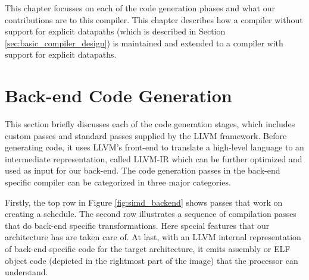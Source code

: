 

This chapter focusses on each of the code generation phases and what our contributions are to this compiler. This chapter describes how a compiler without support for explicit datapaths (which is described in Section \ref{sec:basic_compiler_design}) is maintained and extended to a compiler with support for explicit datapaths. 



\section{Back-end Code Generation}\label{sec:code_generation}
This section briefly discusses each of the code generation stages, which includes custom passes and standard passes supplied by the LLVM framework. Before generating code, it uses LLVM's front-end to translate a high-level language to an intermediate representation, called LLVM-IR which can be further optimized and used as input for our back-end. The code generation passes in the back-end specific compiler can be categorized in three major categories.



Firstly, the top row in Figure \ref{fig:simd_backend} shows passes that work on creating a schedule. The second row illustrates a sequence of compilation passes that do back-end specific transformations. Here special features that our architecture has are taken care of. At last, with an LLVM internal representation of back-end specific code for the target architecture, it emits assembly or ELF object code (depicted in the rightmost part of the image) that the processor can understand.


